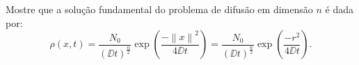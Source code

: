 \question
Mostre que a solução fundamental do problema de difusão em dimensão $ n $ é dada
por:
\[
  \rho(x, t) =
		\frac{N_0}{(\DD t)^{\frac{n}{2}}} \exp{\left(\frac{-\left\|x\right\|^2}{4\DD t}\right)} =
		\frac{N_0}{(\DD t)^{\frac{n}{2}}} \exp{\left(\frac{-r^2}{4\DD t}\right)}.
\]
